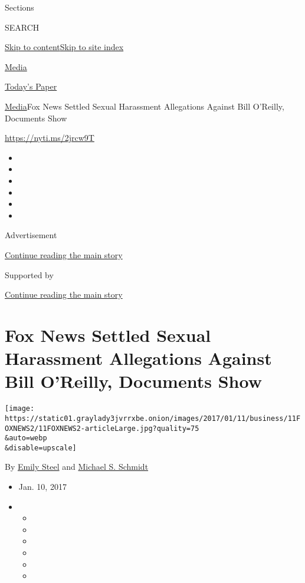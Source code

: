 Sections

SEARCH

\protect\hyperlink{site-content}{Skip to
content}\protect\hyperlink{site-index}{Skip to site index}

\href{https://www.nytimes3xbfgragh.onion/pages/business/media/index.html}{Media}

\href{https://myaccount.nytimes3xbfgragh.onion/auth/login?response_type=cookie\&client_id=vi}{}

\href{https://www.nytimes3xbfgragh.onion/section/todayspaper}{Today's
Paper}

\href{/pages/business/media/index.html}{Media}\textbar{}Fox News Settled
Sexual Harassment Allegations Against Bill O'Reilly, Documents Show

\url{https://nyti.ms/2jrcw9T}

\begin{itemize}
\item
\item
\item
\item
\item
\item
\end{itemize}

Advertisement

\protect\hyperlink{after-top}{Continue reading the main story}

Supported by

\protect\hyperlink{after-sponsor}{Continue reading the main story}

\hypertarget{fox-news-settled-sexual-harassment-allegations-against-bill-oreilly-documents-show}{%
\section{Fox News Settled Sexual Harassment Allegations Against Bill
O'Reilly, Documents
Show}\label{fox-news-settled-sexual-harassment-allegations-against-bill-oreilly-documents-show}}

\texttt{[image: https://static01.graylady3jvrrxbe.onion/images/2017/01/11/business/11FOXNEWS2/11FOXNEWS2-articleLarge.jpg?quality=75\\\&auto=webp\\\&disable=upscale]}

By \href{https://www.nytimes3xbfgragh.onion/by/emily-steel}{Emily Steel}
and
\href{http://www.nytimes3xbfgragh.onion/by/michael-s-schmidt}{Michael S.
Schmidt}

\begin{itemize}
\item
  Jan. 10, 2017
\item
  \begin{itemize}
  \item
  \item
  \item
  \item
  \item
  \item
  \end{itemize}
\end{itemize}


